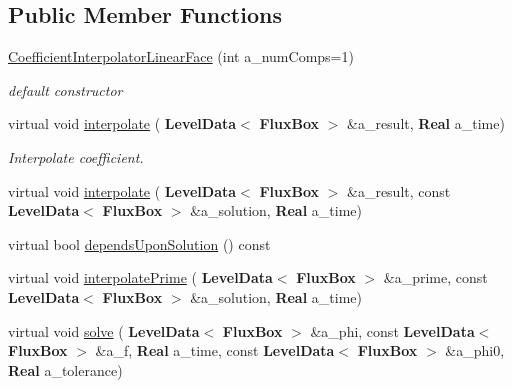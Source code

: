 \subsection*{Public Member Functions}
\begin{DoxyCompactItemize}
\item 
\mbox{\label{class_coefficient_interpolator_linear_face_a64b4959fa8d8df6705df5a8baf31f3f5}} 
\hyperlink{class_coefficient_interpolator_linear_face_a64b4959fa8d8df6705df5a8baf31f3f5}{Coefficient\+Interpolator\+Linear\+Face} (int a\+\_\+num\+Comps=1)
\begin{DoxyCompactList}\small\item\em default constructor \end{DoxyCompactList}\item 
\mbox{\label{class_coefficient_interpolator_linear_face_a08d5f51d4204deb361b6c8cb054cff69}} 
virtual void \hyperlink{class_coefficient_interpolator_linear_face_a08d5f51d4204deb361b6c8cb054cff69}{interpolate} (\textbf{ Level\+Data}$<$ \textbf{ Flux\+Box} $>$ \&a\+\_\+result, \textbf{ Real} a\+\_\+time)
\begin{DoxyCompactList}\small\item\em Interpolate coefficient. \end{DoxyCompactList}\item 
virtual void \hyperlink{class_coefficient_interpolator_linear_face_a825a5def3f5da9e2a8890bd46d2af5b0}{interpolate} (\textbf{ Level\+Data}$<$ \textbf{ Flux\+Box} $>$ \&a\+\_\+result, const \textbf{ Level\+Data}$<$ \textbf{ Flux\+Box} $>$ \&a\+\_\+solution, \textbf{ Real} a\+\_\+time)
\item 
virtual bool \hyperlink{class_coefficient_interpolator_linear_face_a5403028af5179675f232939044032a14}{depends\+Upon\+Solution} () const
\item 
virtual void \hyperlink{class_coefficient_interpolator_linear_face_a6a9d41e8aac928cad20649644ce70aeb}{interpolate\+Prime} (\textbf{ Level\+Data}$<$ \textbf{ Flux\+Box} $>$ \&a\+\_\+prime, const \textbf{ Level\+Data}$<$ \textbf{ Flux\+Box} $>$ \&a\+\_\+solution, \textbf{ Real} a\+\_\+time)
\item 
virtual void \hyperlink{class_coefficient_interpolator_linear_face_aa1d2b29813de7845fda24e5c523ca5b7}{solve} (\textbf{ Level\+Data}$<$ \textbf{ Flux\+Box} $>$ \&a\+\_\+phi, const \textbf{ Level\+Data}$<$ \textbf{ Flux\+Box} $>$ \&a\+\_\+f, \textbf{ Real} a\+\_\+time, const \textbf{ Level\+Data}$<$ \textbf{ Flux\+Box} $>$ \&a\+\_\+phi0, \textbf{ Real} a\+\_\+tolerance)

\end{DoxyCompactItemize}
